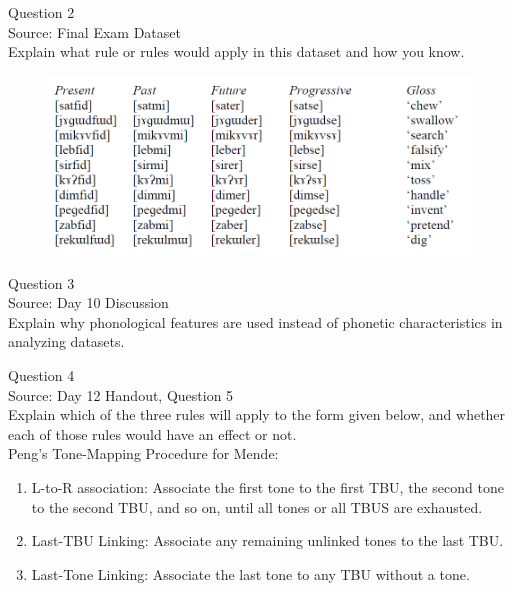 \documentclass[12pt]{article}
\begin{document}
\newpage

{\large Question 2}\\

Source: Final Exam Dataset\\

Explain what rule or rules would apply in this dataset and how you know.\\

\begin{figure}[H]
\includegraphics{../images/final_dataset.png}
\end{figure}

\newpage

{\large Question 3}\\

Source: Day 10 Discussion\\

Explain why phonological features are used instead of phonetic characteristics in analyzing datasets.\\


\newpage

{\large Question 4}\\

Source: Day 12 Handout, Question 5\\

Explain which of the three rules will apply to the form given below, and whether each of those rules would have an effect or not.\\

Peng’s Tone-Mapping Procedure for Mende: \begin{enumerate} \item L-to-R association: Associate the first tone to the first TBU, the second tone to the second TBU, and so on, until all tones or all TBUS are exhausted. \item Last-TBU Linking: Associate any remaining unlinked tones to the last TBU. \item Last-Tone Linking: Associate the last tone to any TBU without a tone. \end{enumerate}
\end{document}
